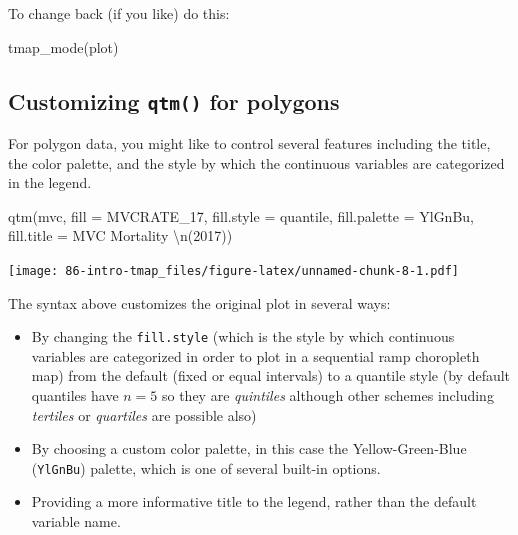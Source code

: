 \documentclass[
]{book}
\newenvironment{Shaded}{\begin{snugshade}}{\end{snugshade}}
\newcommand{\AttributeTok}[1]{\textcolor[rgb]{0.77,0.63,0.00}{#1}}
\newcommand{\FunctionTok}[1]{\textcolor[rgb]{0.00,0.00,0.00}{#1}}
\newcommand{\NormalTok}[1]{#1}
\newcommand{\SpecialCharTok}[1]{\textcolor[rgb]{0.00,0.00,0.00}{#1}}
\newcommand{\StringTok}[1]{\textcolor[rgb]{0.31,0.60,0.02}{#1}}
\providecommand{\tightlist}{%
  \setlength{\itemsep}{0pt}\setlength{\parskip}{0pt}}
\begin{document}
To change back (if you like) do this:

\begin{Shaded}
\begin{Highlighting}[]
\FunctionTok{tmap\_mode}\NormalTok{(}\StringTok{\textquotesingle{}plot\textquotesingle{}}\NormalTok{)}
\end{Highlighting}
\end{Shaded}

\hypertarget{customizing-qtm-for-polygons}{%
\subsection{\texorpdfstring{Customizing \texttt{qtm()} for polygons}{Customizing qtm() for polygons}}\label{customizing-qtm-for-polygons}}

For polygon data, you might like to control several features including the title, the color palette, and the style by which the continuous variables are categorized in the legend.

\begin{Shaded}
\begin{Highlighting}[]
\FunctionTok{qtm}\NormalTok{(mvc,}
    \AttributeTok{fill =} \StringTok{\textquotesingle{}MVCRATE\_17\textquotesingle{}}\NormalTok{, }
    \AttributeTok{fill.style =} \StringTok{\textquotesingle{}quantile\textquotesingle{}}\NormalTok{, }
    \AttributeTok{fill.palette =} \StringTok{\textquotesingle{}YlGnBu\textquotesingle{}}\NormalTok{,}
    \AttributeTok{fill.title =} \StringTok{\textquotesingle{}MVC Mortality }\SpecialCharTok{\textbackslash{}n}\StringTok{(2017)\textquotesingle{}}\NormalTok{)}
\end{Highlighting}
\end{Shaded}

\texttt{[image: 86-intro-tmap\_files/figure-latex/unnamed-chunk-8-1.pdf]}

The syntax above customizes the original plot in several ways:

\begin{itemize}
\tightlist
\item
  By changing the \texttt{fill.style} (which is the style by which continuous variables are categorized in order to plot in a sequential ramp choropleth map) from the default (fixed or equal intervals) to a quantile style (by default quantiles have \(n=5\) so they are \emph{quintiles} although other schemes including \emph{tertiles} or \emph{quartiles} are possible also)
\item
  By choosing a custom color palette, in this case the Yellow-Green-Blue (\texttt{YlGnBu}) palette, which is one of several built-in options.
\item
  Providing a more informative title to the legend, rather than the default variable name.
\end{itemize}
\end{document}
